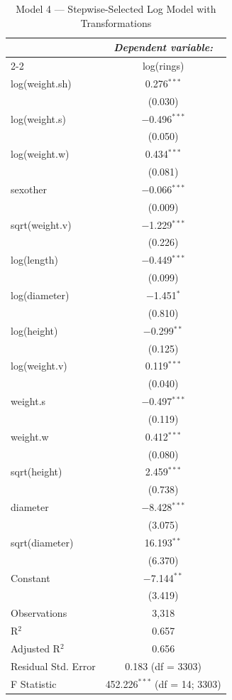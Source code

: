 \documentclass[12pt]{article}
\begin{document}
	\begin{table}[!htbp]
		\centering
		\caption{Model 4 — Stepwise-Selected Log Model with Transformations}
		\label{tab:fit4}
		\begin{tabular}{@{\extracolsep{5pt}}lc}
			\toprule
			& \multicolumn{1}{c}{\textit{Dependent variable:}} \\
			\cmidrule(lr){2-2}
			& log(rings) \\
			\midrule
			log(weight.sh) & 0.276$^{***}$ \\ 
			& (0.030) \\[0.4ex]
			log(weight.s)  & $-$0.496$^{***}$ \\ 
			& (0.050) \\[0.4ex]
			log(weight.w)  & 0.434$^{***}$ \\ 
			& (0.081) \\[0.4ex]
			sexother       & $-$0.066$^{***}$ \\ 
			& (0.009) \\[0.4ex]
			sqrt(weight.v) & $-$1.229$^{***}$ \\ 
			& (0.226) \\[0.4ex]
			log(length)    & $-$0.449$^{***}$ \\ 
			& (0.099) \\[0.4ex]
			log(diameter)  & $-$1.451$^{*}$ \\ 
			& (0.810) \\[0.4ex]
			log(height)    & $-$0.299$^{**}$ \\ 
			& (0.125) \\[0.4ex]
			log(weight.v)  & 0.119$^{***}$ \\ 
			& (0.040) \\[0.4ex]
			weight.s       & $-$0.497$^{***}$ \\ 
			& (0.119) \\[0.4ex]
			weight.w       & 0.412$^{***}$ \\ 
			& (0.080) \\[0.4ex]
			sqrt(height)   & 2.459$^{***}$ \\ 
			& (0.738) \\[0.4ex]
			diameter       & $-$8.428$^{***}$ \\ 
			& (3.075) \\[0.4ex]
			sqrt(diameter) & 16.193$^{**}$ \\ 
			& (6.370) \\[0.4ex]
			Constant       & $-$7.144$^{**}$ \\ 
			& (3.419) \\[0.4ex]
			\midrule
			Observations        & 3,318 \\ 
			R$^{2}$             & 0.657 \\ 
			Adjusted R$^{2}$    & 0.656 \\ 
			Residual Std. Error & 0.183 (df = 3303) \\ 
			F Statistic         & 452.226$^{***}$ (df = 14; 3303) \\ 
			\bottomrule
		\end{tabular}
	\end{table}
	
\end{document}
